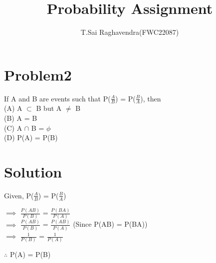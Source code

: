 \documentclass[journal,12pt,twocolumn]{IEEEtran}
\title{\mytitle}
\title{
Probability Assignment
}
\author{T.Sai Raghavendra(FWC22087)}
\begin{document}
\maketitle
\tableofcontents
\bigskip
\section{\textbf{Problem2}}	
If A and B are events such that P($\frac{A}{B}$) = P($\frac{B}{A}$), then\\
(A) A $\subset$ B but A $\not=$ B \\(B) A = B\\
(C) A $\cap$ B = $\phi$ \\(D) P(A) = P(B)\\
\section{\textbf{Solution}}
Given, P($\frac{A}{B}$) = P($\frac{B}{A}$)
\begin{center}
$\implies$ $\frac{P(AB)}{P(B)}$ = $\frac{P(BA)}{P(A)}$\\ 
$\implies$ $\frac{P(AB)}{P(B)}$ = $\frac{P(AB)}{P(A)}$ (Since P(AB) = P(BA))\\
$\implies$ $\frac{1}{P(B)}$ = $\frac{1}{P(A)}$\\
\end{center}
\begin{center}
$\therefore$ P(A) = P(B)
\end{center}
\end{document}
